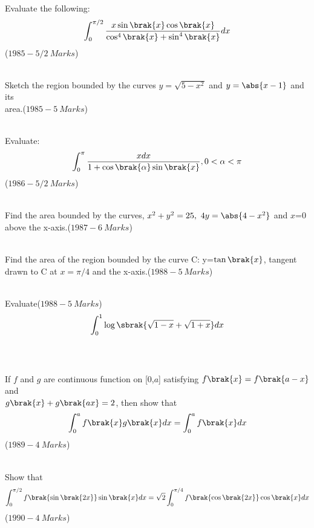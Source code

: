 	     \item Evaluate the following:\begin{align*}
	         \int_{0}^{\pi/2}\frac{x\sin{\brak{x
		     }}\cos{\brak{x}}}{\cos^4{\brak{x}}+\sin^4{\brak{x}}}dx
		     \end{align*}\hfill($1985-5/2\ Marks$)\\\\
		     \item Sketch the region bounded by the curves $y=\sqrt{5-x^2}$ and $y=\abs{x-1}$ and its\\ area.\hfill($1985-5\ Marks$)\\\\
		     \item Evaluate:\begin{align*}
		         \int_{0}^{\pi}\frac{xdx}{1+\cos{\brak{\alpha}}\sin{\brak{x}}},0<\alpha<\pi\end{align*}\hfill($1986-5/2\ Marks$)\\\\
			 \item Find the area bounded by the curves, $x^2+y^2=25,\ 4y=\abs{4-x^2}$ and $x$=0 above the x-axis.\hfill($1987-6\ Marks$)\\\\
			 \item Find the area of the region bounded by the curve C: y=$\tan{\brak{x}}$, tangent drawn to C at $x=\pi/4$ and the x-axis.\hfill($1988-5\ Marks$)\\\\
			 \item Evaluate\hfill($1988-5\ Marks$)\\ \begin{align*}\int_{0}^{1}\log\sbrak{\sqrt{1-x}+\sqrt{1+x}}dx\end{align*}\\\\
				 \item If $f$ and $g$ are continuous function on [0,$a$] satisfying $f\brak{x}=f\brak{a-x}$ and\\$g\brak{x}+g\brak{ax}=2$, then show that \begin{align*}\int_{0}^{a}f\brak{x}g\brak{x}dx = \int_{0}^{a}f\brak{x}dx\end{align*}\hfill($1989-4\ Marks$)\\\\
			 \item Show that \begin{align*}\int_{0}^{\pi/2}f\brak{\sin{\brak{2x}}}\sin{\brak{x}}dx=\sqrt{2}\int_{0}^{\pi/4}f\brak{\cos{\brak{2x}}}\cos{\brak{x}}dx\end{align*}\hfill($1990-4\ Marks$)\\\\\\

